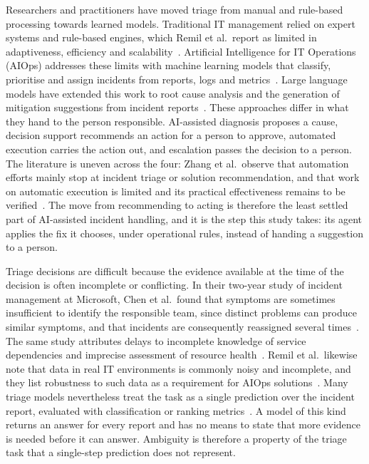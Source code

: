 Researchers and practitioners have moved triage from manual and rule-based processing towards learned models. Traditional IT management relied on expert systems and rule-based engines, which Remil et al.\ report as limited in adaptiveness, efficiency and scalability~\cite{remil2024}. Artificial Intelligence for IT Operations (AIOps) addresses these limits with machine learning models that classify, prioritise and assign incidents from reports, logs and metrics~\cite{chen2020,remil2024}. Large language models have extended this work to root cause analysis and the generation of mitigation suggestions from incident reports~\cite{zhang2025}. These approaches differ in what they hand to the person responsible. AI-assisted diagnosis proposes a cause, decision support recommends an action for a person to approve, automated execution carries the action out, and escalation passes the decision to a person. The literature is uneven across the four: Zhang et al.\ observe that automation efforts mainly stop at incident triage or solution recommendation, and that work on automatic execution is limited and its practical effectiveness remains to be verified~\cite{zhang2025}. The move from recommending to acting is therefore the least settled part of AI-assisted incident handling, and it is the step this study takes: its agent applies the fix it chooses, under operational rules, instead of handing a suggestion to a person.

Triage decisions are difficult because the evidence available at the time of the decision is often incomplete or conflicting. In their two-year study of incident management at Microsoft, Chen et al.\ found that symptoms are sometimes insufficient to identify the responsible team, since distinct problems can produce similar symptoms, and that incidents are consequently reassigned several times~\cite{chen2020}. The same study attributes delays to incomplete knowledge of service dependencies and imprecise assessment of resource health~\cite{chen2020}. Remil et al.\ likewise note that data in real IT environments is commonly noisy and incomplete, and they list robustness to such data as a requirement for AIOps solutions~\cite{remil2024}. Many triage models nevertheless treat the task as a single prediction over the incident report, evaluated with classification or ranking metrics~\cite{remil2024}. A model of this kind returns an answer for every report and has no means to state that more evidence is needed before it can answer. Ambiguity is therefore a property of the triage task that a single-step prediction does not represent.

